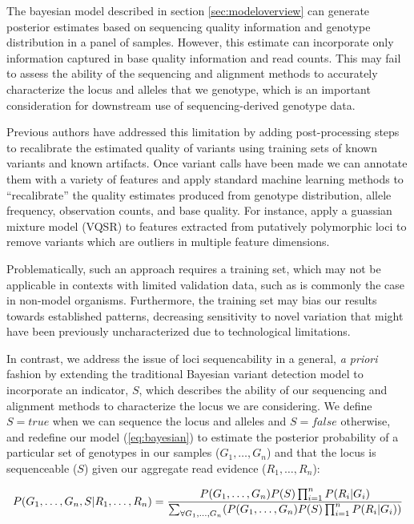 \documentclass{article}
\begin{document}
The bayesian model described in section \ref{sec:modeloverview} can generate posterior estimates based on sequencing quality information and genotype distribution in a panel of samples.  However, this estimate can incorporate only information captured in base quality information and read counts.  This may fail to assess the ability of the sequencing and alignment methods to accurately characterize the locus and alleles that we genotype, which is an important consideration for downstream use of sequencing-derived genotype data.

Previous authors have addressed this limitation by adding post-processing steps to recalibrate the estimated quality of variants using training sets of known variants and known artifacts.  Once variant calls have been made we can annotate them with a variety of features and apply standard machine learning methods to ``recalibrate'' the quality estimates produced from genotype distribution, allele frequency, observation counts, and base quality.  For instance, \cite{gatk2011} apply a guassian mixture model (VQSR) to features extracted from putatively polymorphic loci to remove variants which are outliers in multiple feature dimensions. %

Problematically, such an approach requires a training set, which may not be applicable in contexts with limited validation data, such as is commonly the case in non-model organisms.  Furthermore, the training set may bias our results towards established patterns, decreasing sensitivity to novel variation that might have been previously uncharacterized due to technological limitations.

In contrast, we address the issue of loci sequencability in a general, \emph{a priori} fashion by extending the traditional Bayesian variant detection model to incorporate an indicator, $S$, which describes the ability of our sequencing and alignment methods to characterize the locus we are considering.  We define $S = true$ when we can sequence the locus and alleles and $S = false$ otherwise, and redefine our model (\ref{eq:bayesian}) to estimate the posterior probability of a particular set of genotypes in our samples ($G_1,\ldots,G_n$) and that the locus is sequenceable ($S$) given our aggregate read evidence ($R_1,\ldots,R_n$):

\begin{equation}
\label{eq:bayesianandmodel}
P(G_1,\ldots,G_n, S | R_1,\ldots,R_n)  = { P(G_1,\ldots,G_n) P(S) \prod_{i=1}^n P(R_i|G_i) \over 
\sum_{\forall{G_1,\ldots,G_n}} ( P(G_1,\ldots,G_n) P(S) \prod_{i=1}^n P(R_i|G_i) ) }
\end{equation}
\end{document}
